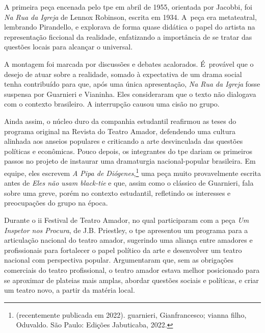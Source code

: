A primeira peça encenada pelo {\sc tpe} em abril de 1955, orientada por
Jacobbi, foi {\it Na Rua da Igreja} de Lennox Robinson, escrita em
1934. A~peça era metateatral, lembrando Pirandello, e explorava de forma
quase didática o papel do artista na representação ficcional da
realidade, enfatizando a importância de se tratar das questões locais
para alcançar o universal.

A montagem foi marcada por discussões e debates acalorados. É~provável
que o desejo de atuar sobre a realidade, somado à expectativa de um
drama social tenha contribuído para que, após uma única apresentação,
{\it Na Rua da Igreja} fosse suspensa por Guarnieri e Vianinha. Eles
consideraram que o texto não dialogava com o contexto brasileiro. A
interrupção causou uma cisão no grupo.

Ainda assim, o núcleo duro da companhia estudantil reafirmou as teses do
programa original na Revista do Teatro Amador, defendendo uma cultura
alinhada aos anseios populares e criticando a arte desvinculada das
questões políticas e econômicas. Pouco depois, os integrantes do {\sc tpe}
dariam os primeiros passos no projeto de instaurar uma dramaturgia
nacional-popular brasileira. Em equipe, eles escrevem {\it A Pipa de
Diógenes},\footnote{(recentemente publicada em 2022). {\sc guarnieri},
  Gianfrancesco; {\sc vianna filho}, Oduvaldo. São Paulo: Edições Jabuticaba,
  2022.} uma peça muito provavelmente escrita antes de {\it Eles não
usam black-tie} e que, assim como o clássico de Guarnieri, fala sobre
uma greve, porém no contexto estudantil, refletindo os interesses e
preocupações do grupo na época.

Durante o {\sc ii} Festival de Teatro Amador, no qual participaram com a peça
{\it Um Inspetor nos Procura}, de J.B. Priestley, o {\sc tpe} apresentou um
programa para a articulação nacional do teatro amador, sugerindo uma
aliança entre amadores e profissionais para fortalecer o papel político
da arte e desenvolver um teatro nacional com perspectiva popular.
Argumentaram que, sem as obrigações comerciais do teatro profissional, o
teatro amador estava melhor posicionado para se aproximar de plateias
mais amplas, abordar questões sociais e políticas, e criar um teatro
novo, a partir da matéria local.

